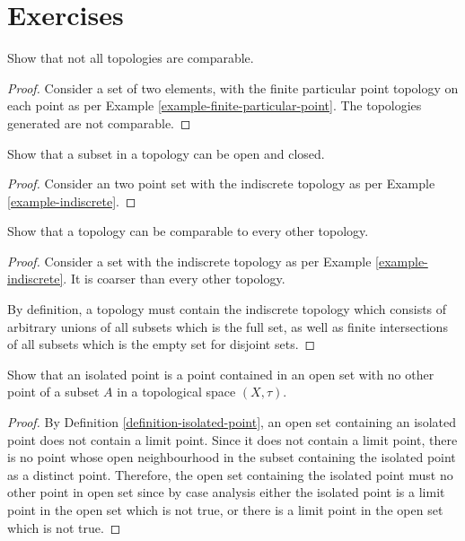 \section{Exercises}

\begin{exercise}
    \label{exercise-comparable-topology}
Show that not all topologies are comparable.
\end{exercise}

\begin{proof}
    Consider a set of two elements, with the finite particular point topology on each point as per Example \ref{example-finite-particular-point}. The topologies generated are not comparable.
\end{proof}

\begin{exercise}
    \label{exercise-open-closed}
Show that a subset in a topology can be open and closed.
\end{exercise}

\begin{proof}
    Consider an two point set with the indiscrete topology as per Example \ref{example-indiscrete}.
\end{proof}

\begin{exercise}
    \label{exercise-comparable}
Show that a topology can be comparable to every other topology.
\end{exercise}

\begin{proof}
    Consider a set with the indiscrete topology as per Example \ref{example-indiscrete}. It is coarser than every other topology.

    By definition, a topology must contain the indiscrete topology which consists of arbitrary unions of all subsets which is the full set, as well as finite intersections of all subsets which is the empty set for disjoint sets.
\end{proof}

\begin{exercise}
	\label{exercise-motivation-isolated-point}
	Show that an isolated point is a point contained in an open set with no other point of a subset $A$ in a topological space $(X, \tau)$.
\end{exercise}

\begin{proof}
	By Definition \ref{definition-isolated-point}, an open set containing an isolated point does not contain a limit point. Since it does not contain a limit point, there is no point whose open neighbourhood in the subset containing the isolated point as a distinct point. Therefore, the open set containing the isolated point must no other point in open set since by case analysis either the isolated point is a limit point in the open set which is not true, or there is a limit point in the open set which is not true.
\end{proof}


